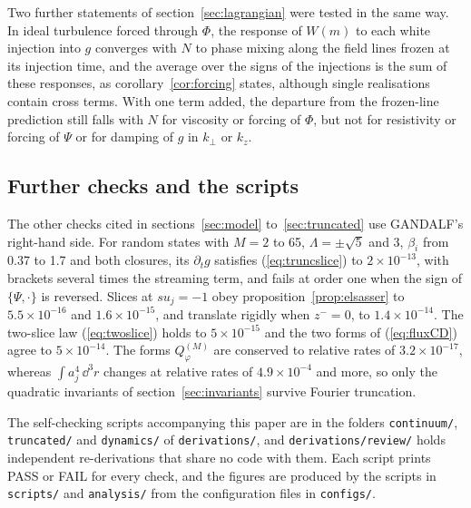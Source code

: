 Two further statements of section~\ref{sec:lagrangian} were tested in the same way. In ideal turbulence forced through $\Phi$, the response of $W(m)$ to each white injection into $g$ converges with $N$ to phase mixing along the field lines frozen at its injection time, and the average over the signs of the injections is the sum of these responses, as corollary~\ref{cor:forcing} states, although single realisations contain cross terms. With one term added, the departure from the frozen-line prediction still falls with $N$ for viscosity or forcing of $\Phi$, but not for resistivity or forcing of $\Psi$ or for damping of $g$ in $k_\perp$ or $k_z$.

\subsection{Further checks and the scripts}\label{num:rhs}

The other checks cited in sections~\ref{sec:model} to~\ref{sec:truncated} use GANDALF's right-hand side. For random states with $M=2$ to 65, $\Lambda=\pm\sqrt5$ and 3, $\beta_i$ from 0.37 to 1.7 and both closures, its $\partial_tg$ satisfies (\ref{eq:truncslice}) to $2\times10^{-13}$, with brackets several times the streaming term, and fails at order one when the sign of $\{\Psi,\cdot\}$ is reversed. Slices at $su_j=-1$ obey proposition~\ref{prop:elsasser} to $5.5\times10^{-16}$ and $1.6\times10^{-15}$, and translate rigidly when $z^-=0$, to $1.4\times10^{-14}$. The two-slice law (\ref{eq:twoslice}) holds to $5\times10^{-15}$ and the two forms of (\ref{eq:fluxCD}) agree to $5\times10^{-14}$. The forms $Q^{(M)}_\varphi$ are conserved to relative rates of $3.2\times10^{-17}$, whereas $\int a_j^4\,\dd^3r$ changes at relative rates of $4.9\times10^{-4}$ and more, so only the quadratic invariants of section~\ref{sec:invariants} survive Fourier truncation.

The self-checking scripts accompanying this paper are in the folders \texttt{continuum/}, \texttt{truncated/} and \texttt{dynamics/} of \texttt{derivations/}, and \texttt{derivations/review/} holds independent re-derivations that share no code with them. Each script prints PASS or FAIL for every check, and the figures are produced by the scripts in \texttt{scripts/} and \texttt{analysis/} from the configuration files in \texttt{configs/}.

